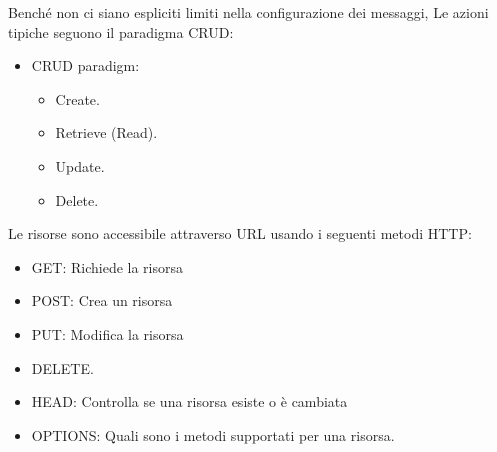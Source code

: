\documentclass{article}
\begin{document}
		Benché non ci siano espliciti limiti nella configurazione dei messaggi, Le azioni tipiche seguono il paradigma CRUD:
		\begin{itemize}
		    \item CRUD paradigm: 
		    \begin{itemize}
		        \item Create.
		        \item Retrieve (Read).
		        \item Update.
		        \item Delete.
		    \end{itemize}
		\end{itemize}
		
		Le risorse sono accessibile attraverso URL usando i seguenti metodi HTTP:
		\begin{itemize}
		    \item GET: Richiede la risorsa
		    \item POST: Crea un risorsa
		    \item PUT: Modifica la risorsa
		    \item DELETE.
		    \item HEAD: Controlla se una risorsa esiste o è cambiata
		    \item OPTIONS: Quali sono i metodi supportati per una risorsa. 
		\end{itemize}
		
\end{document}
